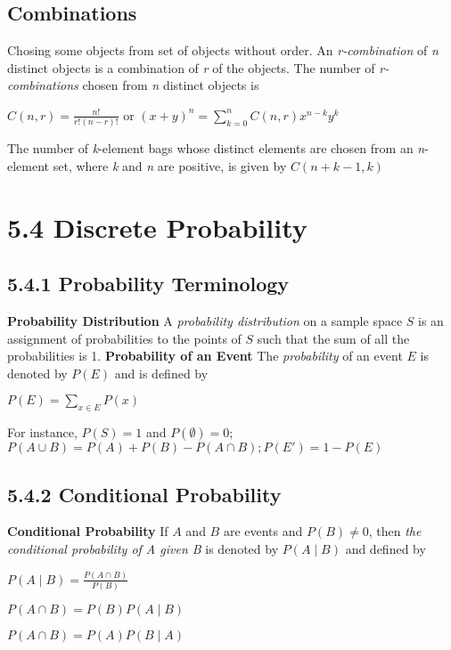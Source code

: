 \documentclass[10pt,twocolumn]{article}
\newenvironment{packed_list}{
\begin{itemize}
  \setlength{\itemsep}{1pt}
  \setlength{\parskip}{0pt}
  \setlength{\parsep}{0pt}
}{\end{itemize}}
\begin{document}
	\subsection*{Combinations}
	Chosing some objects from set of objects without order.
	An \textit{r-combination} of \textit{n} distinct objects is a
        combination of \textit{r} of the objects. The number of
        \textit{r-combinations} chosen from \textit{n} distinct objects is
	\begin{center}$C(n,r)=\frac{n!}{r!(n-r)!}$ or $(x+y)^n=\sum_{k=0}^nC(n,r)x^{n-k}y^k$\end{center}
	The number of \textit{k}-element bags whose distinct elements
        are chosen from an \textit{n}-element set, where \textit{k}
        and \textit{n} are positive, is given by $C(n+k-1, k)$

	\section*{5.4 Discrete Probability}
	\subsection*{5.4.1 Probability Terminology}

	\textbf{Probability Distribution} A \emph{probability
          distribution} on a sample space $S$ is an assignment of
        probabilities to the points of $S$ such that the sum of all
        the probabilities is 1.
	\textbf{Probability of an Event} The \emph{probability} of an
        event $E$ is denoted by $P(E)$ and is defined by
	\begin{center}$P(E)=\sum_{x\in E}P(x)$\end{center}
	For instance, $P(S)=1$ and $P(\emptyset)=0$; $P(A\cup B)=P(A)+P(B)-P(A\cap B); P(E')=1-P(E)$
	
	\subsection*{5.4.2 Conditional Probability}
	
	\textbf{Conditional Probability} If $A$ and $B$ are events and
        $P(B)\neq0$, then \emph{the conditional probability of A given
          B} is denoted by $P(A\mid B)$ and defined by
	\begin{packed_list}
          \item $P(A\mid B)=\frac{P(A\cap B)}{P(B)}$
	\item $P(A\cap B)=P(B)P(A\mid B)$
	\item $P(A\cap B)=P(A)P(B\mid A)$
          \end{packed_list}
\end{document}
